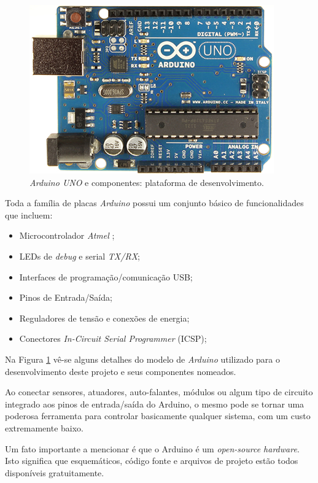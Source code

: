 \documentclass[
    12pt,               %
    openright,          %
    oneside,
    a4paper,            
    english,            %
    brazil              %
    ]{abntex2}
\begin{document}
\begin{figure}[!htb]
  \begin{center}
    \caption{\label{arduino}\textit{Arduino UNO} e componentes: plataforma de desenvolvimento.}
    \includegraphics[scale=0.35]{images/arduino2.jpg}
  \end{center}
\end{figure}

Toda a família de placas \textit{Arduino} possui um conjunto básico de funcionalidades que incluem:

\begin{itemize}
  \item Microcontrolador \textit{Atmel} ;
  \item LEDs de \textit{debug} e serial \textit{TX/RX};
  \item Interfaces de programação/comunicação USB;
  \item Pinos de Entrada/Saída;
  \item Reguladores de tensão e conexões de energia;
  \item Conectores \textit{In-Circuit Serial Programmer} (ICSP);
\end{itemize}

Na Figura \ref{arduino} v\^e-se alguns detalhes do modelo de \textit{Arduino} utilizado para o desenvolvimento deste projeto e seus componentes nomeados.

Ao conectar sensores, atuadores, auto-falantes, módulos ou algum tipo de circuito integrado aos pinos de entrada/saída do Arduino, o mesmo pode se tornar uma poderosa ferramenta para controlar basicamente qualquer sistema, com um custo extremamente baixo. 

Um fato importante a mencionar é que o Arduino é um \textit{open-source hardware}. Isto significa que esquemáticos, código fonte e arquivos de projeto estão todos disponíveis gratuitamente.
\end{document}

